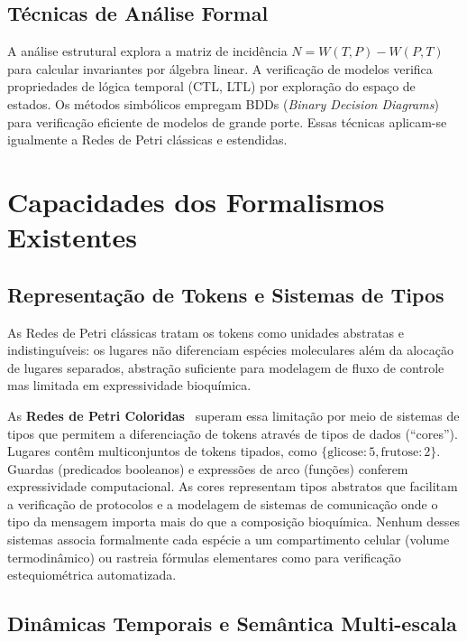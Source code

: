 \subsection{Técnicas de Análise Formal}
\label{subsec:analise-formal}

A análise estrutural explora a matriz de incidência $N = W(T, P) - W(P, T)$ para
calcular invariantes por álgebra linear. A verificação de modelos verifica
propriedades de lógica temporal (CTL, LTL) por exploração do espaço de estados.
Os métodos simbólicos empregam BDDs (\textit{Binary Decision Diagrams}) para
verificação eficiente de modelos de grande porte. Essas técnicas aplicam-se
igualmente a Redes de Petri clássicas e estendidas.

\section{Capacidades dos Formalismos Existentes}
\label{sec:capacidades}

\subsection{Representação de Tokens e Sistemas de Tipos}
\label{subsec:tokens}

As Redes de Petri clássicas tratam os tokens como unidades abstratas e
indistinguíveis: os lugares não diferenciam espécies moleculares além da
alocação de lugares separados, abstração suficiente para modelagem de fluxo de
controle mas limitada em expressividade bioquímica.

As \textbf{Redes de Petri Coloridas}~\cite{Jensen1981} superam essa limitação
por meio de sistemas de tipos que permitem a diferenciação de tokens através de
tipos de dados (``cores''). Lugares contêm multiconjuntos de tokens tipados, como
$\{\text{glicose}:5, \text{frutose}:2\}$. Guardas (predicados booleanos) e
expressões de arco (funções) conferem expressividade computacional. As cores
representam tipos abstratos que facilitam a verificação de protocolos e a
modelagem de sistemas de comunicação onde o tipo da mensagem importa mais do que
a composição bioquímica. Nenhum desses sistemas associa formalmente cada espécie
a um compartimento celular (volume termodinâmico) ou rastreia fórmulas
elementares como  para verificação estequiométrica automatizada.

\subsection{Dinâmicas Temporais e Semântica Multi-escala}
\label{subsec:dinamicas}

